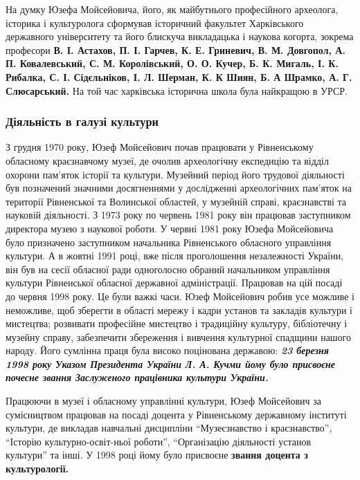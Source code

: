 На думку Юзефа Мойсейовича, його, як майбутнього професійного археолога,
історика і культуролога сформував історичний факультет Харківського державного
університету та його блискуча викладацька і наукова когорта, зокрема професори
\textbf{В. І. Астахов, П. І. Гарчев, К. Е. Гриневич, В. М. Довгопол, А. П.
Ковалевський, С. М. Королівський, О. О. Кучер, Б. К. Мигаль, І. К. Рибалка, С.
І. Сідєльніков, І. Л. Шерман, К. К Шиян, Б. А Шрамко, А. Г. Слюсарський.} На той
час харківська історична школа була найкращою в УРСР.


\subsubsection{Діяльність в галузі культури}

З грудня 1970 року, Юзеф Мойсейович почав працювати у Рівненському обласному
краєзнавчому музеї, де очолив археологічну експедицію та відділ охорони
пам'яток історії та культури. Музейний період його трудової діяльності був
позначений значними досягненнями у дослідженні археологічних пам'яток на
території Рівненської та Волинської областей, у музейній справі, краєзнавстві
та науковій діяльності. З 1973 року по червень 1981 року він працював
заступником директора музею з наукової роботи. У червні 1981 року Юзефа
Мойсейовича було призначено заступником начальника Рівненського обласного
управління культури. А в жовтні 1991 році, вже після проголошення незалежності
України, він був на сесії обласної ради одноголосно обраний начальником
управління культури Рівненської обласної державної адміністрації. Працював на
цій посаді до червня 1998 року. Це були важкі часи. Юзеф Мойсейович робив усе
можливе і неможливе, щоб зберегти в області мережу і кадри установ та закладів
культури і мистецтва; розвивати професійне мистецтво і традиційну культуру,
бібліотечну і музейну справу, забезпечити збереження і вивчення культурної
спадщини нашого народу. Його сумлінна праця була високо поцінована державою: \emph{\textbf{23
березня 1998 року Указом Президента України Л. А. Кучми йому було присвоєне
почесне звання Заслуженого працівника культури України.}}

Працюючи в музеї і обласному управлінні культури, Юзеф Мойсейович за
сумісництвом працював на посаді доцента у Рівненському державному інституті
культури, де викладав навчальні дисципліни \enquote{Музеєзнавство і краєзнавство},
\enquote{Історію культурно-освіт\hyp{}ньої роботи}, \enquote{Організацію діяльності установ культури}
та інші. У 1998 році йому було присвоєне \textbf{звання доцента з культурології.}

